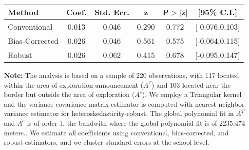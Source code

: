 \begin{table}[htbp]\centering
 \footnotesize 
\begin{tabular}{lccccc}
\hline\hline
Method & Coef. & Std. Err. & z & P$>|$z$|$ & [95\% C.I.] \\ 
\hline \hline  
Conventional & 0.013 & 0.046 & 0.290 & 0.772 & [-0.076,0.103] \\ 
 Bias-Corrected & 0.026 & 0.046 & 0.561 & 0.575 & [-0.064,0.115] \\ 
Robust & 0.026 & 0.062 & 0.415 & 0.678 & [-0.095,0.147] \\ 
  \hline\hline
\end{tabular}
\label{table:rd}
\begin{tablenotes} 
  \justifying \tiny \textbf{Note: }    
   The analysis is based on a sample of 220 observations, with 117 located within the area of exploration announcement ($A^{T}$) and 103 located near the border but outside the area of exploration  ($A^{c}$). 
           We employ a Triangular kernel and the variance-covariance matrix estimator is computed with nearest neighbor variance estimator for heteroskedasticity-robust. The global polynomial fit in  $A^{T}$ and $A^{c}$ is of order 1, the bandwith where the global polynomial fit is of 2235.474 meters.. We estimate all coefficients using conventional, bias-corrected, and robust estimators, and we cluster standard errors at the school level. \end{tablenotes} 
 \end{table} 
